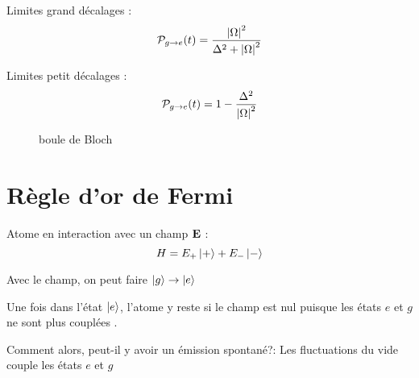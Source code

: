 Limites grand décalages : $$\mathcal{P} _{g \to e} (t) = \frac{\abs{\Omega}^{2}}{\Delta^{2}+\abs{\Omega}^{2}} $$ 


Limites petit décalages : $$\mathcal{P} _{g \to e} (t) = 1 - \frac{\Delta^{2}}{\abs{\Omega}^{2}} $$ 

\begin{figure}[ht]
    \centering
    \caption{boule de Bloch}
    \label{fig:boule-de-bloch}
\end{figure}

\section*{Règle d'or de Fermi}

Atome en interaction avec un champ $\vb{E}$ :
$$H = E_+ \ket{+} + E_- \ket{-}$$ 

Avec le champ, on peut faire $\ket{g}\to \ket{e}$ 

Une fois dans l'état $\ket{e}$, l'atome y reste si  le champ est nul puisque les états $e$ et $g$ ne sont plus couplées . 

Comment alors, peut-il y avoir un émission spontané?: Les fluctuations du vide couple les états $e$ et $g$  




